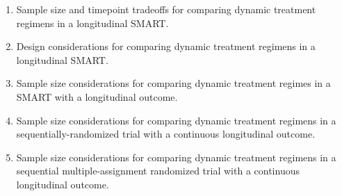 \documentclass[letterpaper,11pt]{article} %
\begin{document}
\begin{enumerate}
\begin{conflist}
		\end{conflist}
		\item Sample size and timepoint tradeoffs for comparing dynamic treatment regimens in a longitudinal SMART.
		\item Design considerations for comparing dynamic treatment regimens  in a longitudinal SMART.
		\item Sample size considerations for comparing dynamic treatment regimes in a SMART with a longitudinal outcome.
		\item Sample size considerations for comparing dynamic treatment regimens in a sequentially-randomized trial with a continuous longitudinal outcome.
		\item Sample size considerations for comparing dynamic treatment regimens in a sequential multiple-assignment randomized trial with a continuous longitudinal outcome.
	\end{enumerate}
\end{document}
